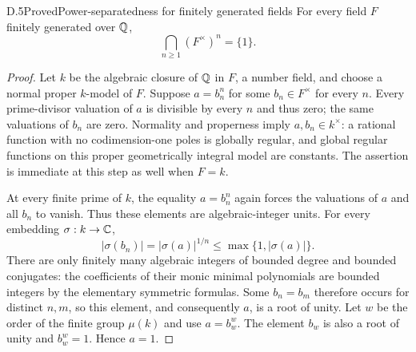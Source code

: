 \begin{statement}{D.5}{Proved}{Power-separatedness for finitely generated fields}
For every field $F$ finitely generated over $\mathbb Q$,
\[
                 \bigcap_{n\ge1}(F^\times)^n=\{1\}.          \tag{D.5.1}
\]
\end{statement}
\begin{proof}
Let $k$ be the algebraic closure of $\mathbb Q$ in $F$, a number field,
and choose a normal proper $k$-model of $F$.
Suppose $a=b_n^n$ for some $b_n\in F^\times$ for every $n$.
Every prime-divisor valuation of $a$ is divisible by every $n$
and thus zero; the same valuations of $b_n$ are zero.
Normality and properness imply $a,b_n\in k^\times$: a rational
function with no codimension-one poles is globally regular, and
global regular functions on this proper geometrically integral
model are constants.  The assertion is immediate at this step
as well when $F=k$.

At every finite prime of $k$, the equality $a=b_n^n$ again forces
the valuations of $a$ and all $b_n$ to vanish.  Thus these elements
are algebraic-integer units.  For every embedding $\sigma:k\to\mathbb C$,
\[
 |\sigma(b_n)|=|\sigma(a)|^{1/n}
       \le\max\{1,|\sigma(a)|\}.
\]
There are only finitely many algebraic integers of bounded degree
and bounded conjugates: the coefficients of their monic minimal
polynomials are bounded integers by the elementary symmetric
formulas.  Some $b_n=b_m$ therefore occurs for distinct $n,m$,
so this element, and consequently $a$, is a root of unity.
Let $w$ be the order of the finite group $\mu(k)$ and use
$a=b_w^w$.  The element $b_w$ is also a root of unity and
$b_w^w=1$.  Hence $a=1$.
\end{proof}

